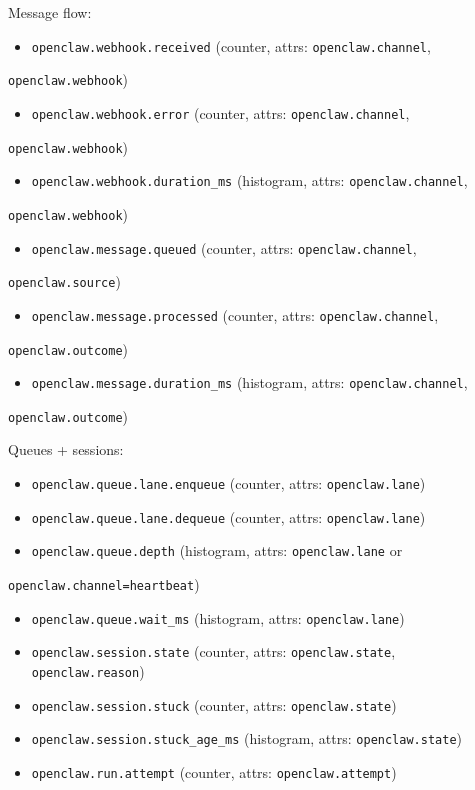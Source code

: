 Message flow:

\begin{itemize}
  \item \texttt{openclaw.webhook.received} (counter, attrs: \texttt{openclaw.channel},
\end{itemize}

\texttt{openclaw.webhook})
\begin{itemize}
  \item \texttt{openclaw.webhook.error} (counter, attrs: \texttt{openclaw.channel},
\end{itemize}

\texttt{openclaw.webhook})
\begin{itemize}
  \item \texttt{openclaw.webhook.duration\_ms} (histogram, attrs: \texttt{openclaw.channel},
\end{itemize}

\texttt{openclaw.webhook})
\begin{itemize}
  \item \texttt{openclaw.message.queued} (counter, attrs: \texttt{openclaw.channel},
\end{itemize}

\texttt{openclaw.source})
\begin{itemize}
  \item \texttt{openclaw.message.processed} (counter, attrs: \texttt{openclaw.channel},
\end{itemize}

\texttt{openclaw.outcome})
\begin{itemize}
  \item \texttt{openclaw.message.duration\_ms} (histogram, attrs: \texttt{openclaw.channel},
\end{itemize}

\texttt{openclaw.outcome})

Queues + sessions:

\begin{itemize}
  \item \texttt{openclaw.queue.lane.enqueue} (counter, attrs: \texttt{openclaw.lane})
  \item \texttt{openclaw.queue.lane.dequeue} (counter, attrs: \texttt{openclaw.lane})
  \item \texttt{openclaw.queue.depth} (histogram, attrs: \texttt{openclaw.lane} or
\end{itemize}

\texttt{openclaw.channel=heartbeat})
\begin{itemize}
  \item \texttt{openclaw.queue.wait\_ms} (histogram, attrs: \texttt{openclaw.lane})
  \item \texttt{openclaw.session.state} (counter, attrs: \texttt{openclaw.state}, \texttt{openclaw.reason})
  \item \texttt{openclaw.session.stuck} (counter, attrs: \texttt{openclaw.state})
  \item \texttt{openclaw.session.stuck\_age\_ms} (histogram, attrs: \texttt{openclaw.state})
  \item \texttt{openclaw.run.attempt} (counter, attrs: \texttt{openclaw.attempt})
\end{itemize}


